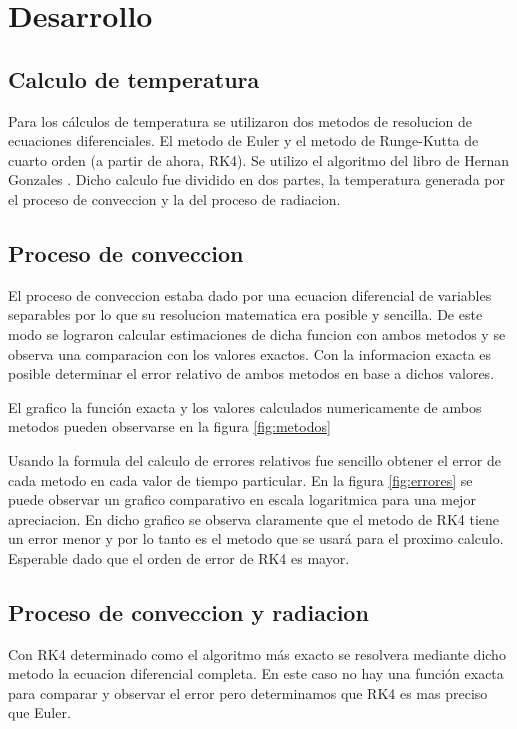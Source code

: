 \documentclass[11pt,a4paper]{article}
\begin{document}
\section{Desarrollo}

\subsection{Calculo de temperatura}

Para los cálculos de temperatura se utilizaron dos metodos de resolucion de ecuaciones diferenciales. El metodo de Euler y el metodo de Runge-Kutta de cuarto orden (a partir de ahora, RK4). Se utilizo el algoritmo del libro de Hernan Gonzales \cite{Gonzales}. Dicho calculo fue dividido en dos partes, la temperatura generada por el proceso de conveccion y la del proceso de radiacion.

\subsection{Proceso de conveccion}

El proceso de conveccion estaba dado por una ecuacion diferencial de variables separables por lo que su resolucion matematica era posible y sencilla. De este modo se lograron calcular estimaciones de dicha funcion con ambos metodos y se observa una comparacion con los valores exactos. Con la informacion exacta es posible determinar el error relativo de ambos metodos en base a dichos valores.

El grafico la función exacta y los valores calculados numericamente de ambos metodos pueden observarse en la figura \ref{fig:metodos}

Usando la formula del calculo de errores relativos fue sencillo obtener el error de cada metodo en cada valor de tiempo particular. En la figura \ref{fig:errores} se puede observar un grafico comparativo en escala logaritmica para una mejor apreciacion. En dicho grafico se observa claramente que el metodo de RK4 tiene un error menor y por lo tanto es el metodo que se usará para el proximo calculo. Esperable dado que el orden de error de RK4 es mayor.

\subsection{Proceso de conveccion y radiacion}

Con RK4 determinado como el algoritmo más exacto se resolvera mediante dicho metodo la ecuacion diferencial completa. En este caso no hay una función exacta para comparar y observar el error pero determinamos que RK4 es mas preciso que Euler.
\end{document}
